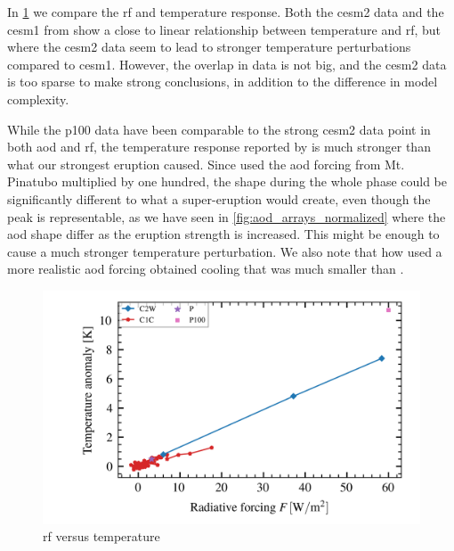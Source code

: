 \documentclass{ametsocV5}
\begin{document}
In \cref{fig:toa_vs_temp} we compare the \acrshort{rf} and temperature response. Both
the \acrshort{cesm2} data and the \acrshort{cesm1} from \citet{ottobliesner2016} show a
close to linear relationship between temperature and \acrshort{rf}, but where the
\acrshort{cesm2} data seem to lead to stronger temperature perturbations compared to
\acrshort{cesm1}. However, the overlap in data is not big, and the \acrshort{cesm2} data
is too sparse to make strong conclusions, in addition to the difference in model
complexity.

While the \acrshort{p100} data have been comparable to the strong \acrshort{cesm2} data
point in both \acrshort{aod} and \acrshort{rf}, the temperature response reported by
\citet{jones2005} is much stronger than what our strongest eruption caused. Since
\citet{jones2005} used the \acrshort{aod} forcing from Mt. Pinatubo multiplied by one
hundred, the shape during the whole phase could be significantly different to what a
super-eruption would create, even though the peak is representable, as we have seen in
\cref{fig:aod_arrays_normalized} where the \acrshort{aod} shape differ as the eruption
strength is increased. This might be enough to cause a much stronger temperature
perturbation. We also note that \citet{timmreck2010} how used a more realistic
\acrshort{aod} forcing obtained cooling that was much smaller than \citet{jones2005}.

\begin{figure}[t]
  \begin{center}
    \includegraphics[width=0.95\linewidth]{figures/toa_vs_temperature.png}
  \end{center}
  \caption{\acrshort{rf} versus temperature}%
  \label{fig:toa_vs_temp}
\end{figure}
\end{document}
